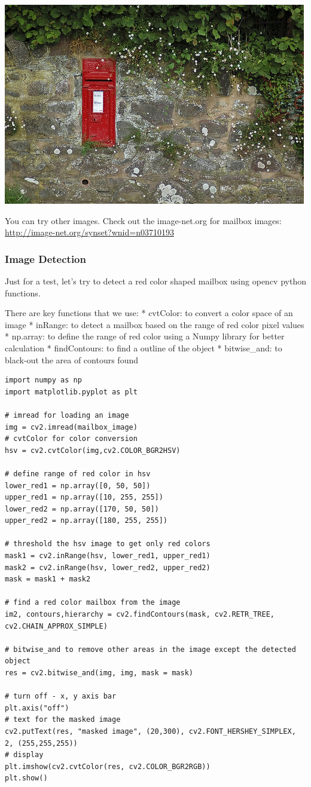 \includegraphics{facedetection_files/facedetection_46_0.jpeg}

You can try other images. Check out the image-net.org for mailbox
images: \url{http://image-net.org/synset?wnid=n03710193}

\subsubsection{Image Detection}\label{image-detection}

Just for a test, let's try to detect a red color shaped mailbox using
opencv python functions.

There are key functions that we use: * cvtColor: to convert a color
space of an image * inRange: to detect a mailbox based on the range of
red color pixel values * np.array: to define the range of red color
using a Numpy library for better calculation * findContours: to find a
outline of the object * bitwise\_and: to black-out the area of contours
found

\begin{verbatim}
import numpy as np
import matplotlib.pyplot as plt

# imread for loading an image
img = cv2.imread(mailbox_image)
# cvtColor for color conversion
hsv = cv2.cvtColor(img,cv2.COLOR_BGR2HSV)

# define range of red color in hsv
lower_red1 = np.array([0, 50, 50])
upper_red1 = np.array([10, 255, 255])
lower_red2 = np.array([170, 50, 50])
upper_red2 = np.array([180, 255, 255])

# threshold the hsv image to get only red colors
mask1 = cv2.inRange(hsv, lower_red1, upper_red1)
mask2 = cv2.inRange(hsv, lower_red2, upper_red2)
mask = mask1 + mask2

# find a red color mailbox from the image
im2, contours,hierarchy = cv2.findContours(mask, cv2.RETR_TREE, cv2.CHAIN_APPROX_SIMPLE)

# bitwise_and to remove other areas in the image except the detected object
res = cv2.bitwise_and(img, img, mask = mask)

# turn off - x, y axis bar
plt.axis("off")
# text for the masked image
cv2.putText(res, "masked image", (20,300), cv2.FONT_HERSHEY_SIMPLEX, 2, (255,255,255))
# display
plt.imshow(cv2.cvtColor(res, cv2.COLOR_BGR2RGB))
plt.show()
\end{verbatim}

